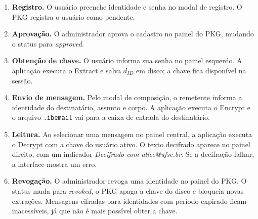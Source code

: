 \begin{enumerate}
  \item \textbf{Registro.} O usuário preenche identidade e senha no modal de registro.
    O PKG registra o usuário como pendente.

  \item \textbf{Aprovação.} O administrador aprova o cadastro no painel do PKG, mudando
    o status para \textit{approved}.

  \item \textbf{Obtenção de chave.} O usuário informa sua senha no painel esquerdo. A
    aplicação executa o Extract e salva $d_{\mathit{ID}}$ em disco; a chave fica
    disponível na sessão.

  \item \textbf{Envio de mensagem.} Pelo modal de composição, o remetente informa a identidade
    do destinatário, assunto e corpo. A aplicação executa o Encrypt e o arquivo
    \texttt{.ibemail} vai para a caixa de entrada do destinatário.

  \item \textbf{Leitura.} Ao selecionar uma mensagem no painel central, a aplicação executa o
    Decrypt com a chave do usuário ativo. O texto decifrado aparece no painel direito, com um
    indicador \textit{Decifrado com alice@ufsc.br}. Se a decifração falhar, a interface mostra
    um erro.

  \item \textbf{Revogação.} O administrador revoga uma identidade no painel do PKG. O status
    muda para \textit{revoked}, o PKG apaga a chave do disco e bloqueia novas extrações.
    Mensagens cifradas para identidades com período expirado ficam inacessíveis, já que não é
    mais possível obter a chave.
\end{enumerate}
